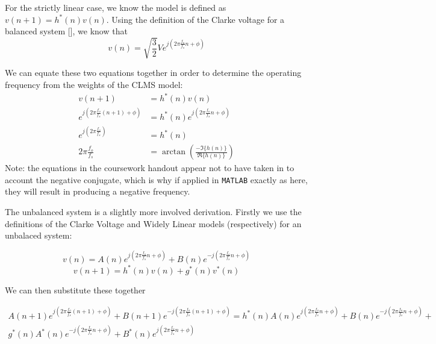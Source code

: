 \documentclass[./main.tex]{subfiles}
\begin{document}
For the strictly linear case, we know the model is defined as $ v(n+1) = h^\ast (n) v(n) $. Using the definition of the Clarke voltage for a balanced system [\cite{Mandic2015}], we know that
\begin{equation}
v(n) = \sqrt{\frac{3}{2}} V e^{j(2 \pi \frac{f_o}{f_s}n + \phi)}
\end{equation}

We can equate these two equations together in order to determine the operating frequency from the weights of the CLMS model:
\begin{equation}
\begin{split}
	v(n+1) &= h^\ast (n) v(n) \\
	e^{j(2 \pi \frac{f_o}{f_s}(n+1) + \phi)} & = h^\ast (n) e^{j(2 \pi \frac{f_o}{f_s}n + \phi)} \\
	e^{j(2 \pi \frac{f_o}{f_s})} & = h^\ast (n) \\
	2 \pi \frac{f_o}{f_s} &= \arctan \left( \frac{ - \Im \{ h(n) \} }{ \Re \{ h(n) \} } \right)
\end{split}
\end{equation}
Note: the equations in the coursework handout appear not to have taken in to account the negative conjugate, which is why if applied in \texttt{MATLAB} exactly as here, they will result in producing a negative frequency.


The unbalanced system is a slightly more involved derivation. Firstly we use the definitions of the Clarke Voltage and Widely Linear models (respectively) for an unbalaced system:

\begin{equation}
v(n) = A(n) e^{j(2 \pi \frac{f_o}{f_s}n + \phi)} + B(n) e^{-j(2 \pi \frac{f_o}{f_s}n + \phi)}
\end{equation}
\begin{equation}
v(n+1) = h^\ast(n)v(n) + g^\ast(n)v^\ast(n)
\end{equation}

We can then substitute these together

\begin{multline}
 A(n+1) e^{j(2 \pi \frac{f_o}{f_s}(n+1) + \phi)} + B(n+1) e^{-j(2 \pi \frac{f_o}{f_s}(n+1) + \phi)} = h^\ast(n) A(n) e^{j(2 \pi \frac{f_o}{f_s}n + \phi)} + B(n) e^{-j(2 \pi \frac{f_o}{f_s}n + \phi)} + \\g^\ast(n) A^\ast(n) e^{-j(2 \pi \frac{f_o}{f_s}n + \phi)} + B^\ast(n) e^{j(2 \pi \frac{f_o}{f_s}n + \phi)}
 \end{multline}
\end{document}
